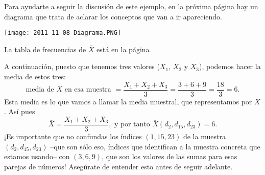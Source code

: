 \begin{itemize}
\begin{ejemplo}
        Para ayudarte a seguir la discusión de este ejemplo, en la próxima página hay un diagrama que trata de aclarar los conceptos que van a ir apareciendo.
        \newpage
        \begin{center}\label{fig:DiagramaDistribucionMediaMuestral}
        \texttt{[image: 2011-11-08-Diagrama.PNG]}
        \end{center}
        {\LARGE La tabla de frecuencias de $\bar X$ está en la página \pageref{subsec:TablaFrecuenciasMediasMuestrales}}
        \newpage

        A continuación, puesto que tenemos tres valores ($X_1$, $X_2$ y  $X_3$), podemos hacer la media de estos tres:
        \[\mbox{media de $X$ en esa muestra }=\dfrac{X_1+X_2+X_3}{3}=\dfrac{3+6+9}{3}=\dfrac{18}{3}=6.\]
        Esta media es lo que vamos a llamar la {\sf media muestral}, que representamos por $\bar X$. Así pues
        \[\bar X=\dfrac{X_1+X_2+X_3}{3},\mbox{ y por tanto }\bar X(d_2,d_{15},d_{23})=6.\]
        ¡Es importante que no confundas los índices $(1,15,23)$ de la muestra $(d_2,d_{15},d_{23})$ --que son sólo eso, índices que identifican a la muestra concreta que estamos usando-- con $(3,6,9)$, que son los valores de las sumas para esas parejas de números! Asegúrate de entender esto antes de seguir adelante.


\end{ejemplo}
\end{itemize}
